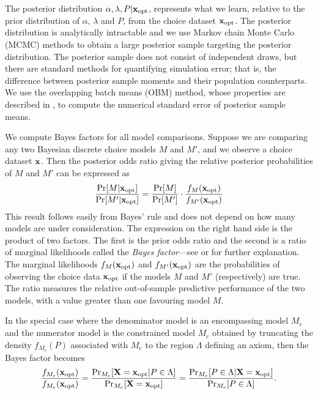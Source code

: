 \documentclass[11pt,letter]{article}
\begin{document}
The posterior distribution $\alpha,\lambda,P|{\bf x}_\mathrm{opt}$, represents what we learn, relative to the prior distribution of $\alpha$, $\lambda$ and $P$, from the choice dataset ${\bf x}_\mathrm{opt}$.
The posterior distribution is analytically intractable and we use Markov chain Monte Carlo (MCMC) methods to obtain a large posterior sample targeting the posterior distribution.
The posterior sample does not consist of independent draws, but there are standard methods for quantifying simulation error; that is, the difference between posterior sample moments and their population counterparts.
We use the overlapping batch means (OBM) method, whose properties are described in , to compute the numerical standard error of posterior sample means.

We compute Bayes factors for all model comparisons.
Suppose we are comparing any two Bayesian discrete choice models $M$ and $M'$, and we observe a choice dataset ${\bf x}$.
Then the posterior odds ratio giving the relative posterior probabilities of $M$ and $M'$ can be expressed as
\[
  \frac{\Pr[M|{\bf x}_\mathrm{opt}]}{\Pr[M'|{\bf x}_\mathrm{opt}]} = \frac{\Pr[M]}{\Pr[M']}
  \cdot
  \frac{f_{M}({\bf x}_\mathrm{opt})}{f_{M'}({\bf x}_\mathrm{opt})}
\]
This result follows easily from Bayes' rule and does not depend on how many models are under consideration.
The expression on the right hand side is the product of two factors.
The first is the prior odds ratio and the second is a ratio of marginal likelihoods called the {\em Bayes factor}---see  or  for further explanation.
The marginal likelihoods $f_{M}({\bf x}_\mathrm{opt})$ and $f_{M'}({\bf x}_\mathrm{opt})$ are the probabilities of observing the choice data ${\bf x}_\mathrm{opt}$ if the models $M$ and $M'$ (respectively) are true.
The ratio measures the relative out-of-sample predictive performance of the two models, with a value greater t{}han one favouring model $M$.

In the special case where the denominator model is an encompassing model $M_e$ and the numerator model is the constrained model $M_c$ obtained by truncating the density $f_{M_e}(P)$ associated with $M_e$ to the region $\Lambda$ defining an axiom, then the Bayes factor becomes
\begin{equation}\label{e:BF}
  \frac{f_{M_c}({\bf x}_\mathrm{opt})}{f_{M_e}({\bf x}_\mathrm{opt})} =
  \frac{\Pr_{M_e}[{\bf X} = {\bf x}_\mathrm{opt}|P \in \Lambda]}{\Pr_{M_e}[{\bf X} = {\bf x}_\mathrm{opt}]} = \frac{\Pr_{M_e}[P \in \Lambda|{\bf X} = {\bf x}_\mathrm{opt}]}{\Pr_{M_e}[P \in \Lambda]}.
\end{equation}
\end{document}
